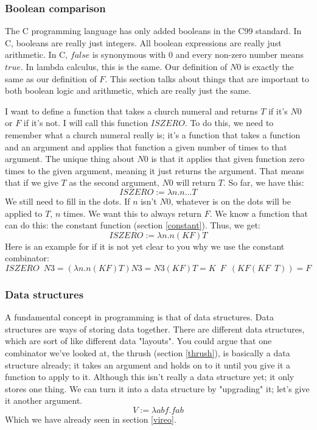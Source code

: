 \documentclass[11pt]{article}
\begin{document}
\subsubsection{Boolean comparison}\label{boolean_comparison}

The C programming language has only added booleans in the C99 standard. In C,
booleans are really just integers. All boolean expressions are really just
arithmetic. In C, \(false\) is synonymous with \(0\) and every non-zero number
means \(true\). In lambda calculus, this is the same. Our definition of \(N0\)
is exactly the same as our definition of \(F\). This section talks about things
that are important to both boolean logic and arithmetic, which are really just
the same.

I want to define a function that takes a church numeral and returns \(T\) if
it's \(N0\) or \(F\) if it's not. I will call this function \(ISZERO\). To do
this, we need to remember what a church numeral really is; it's a function that
takes a function and an argument and applies that function a given number of
times to that argument. The unique thing about \(N0\) is that it applies that
given function zero times to the given argument, meaning it just returns the
argument. That means that if we give \(T\) as the second argument, \(N0\) will
return \(T\). So far, we have this:
\[ISZERO:=\lambda n.n...T\]
We still need to fill in the dots. If \(n\) isn't \(N0\), whatever is on the
dots will be applied to \(T\), \(n\) times. We want this to always return
\(F\). We know a function that can do this: the constant function (section
\ref{constant}). Thus, we get:
\[ISZERO:=\lambda n.n(KF)T\]
Here is an example for if it is not yet clear to you why we use the constant
combinator:
\[ISZERO\enspace N3=(\lambda n.n(KF)T)N3=N3(KF)T=K\enspace F\enspace (KF(KF\enspace T))=F\]

\subsubsection{Data structures}\label{pairs}

A fundamental concept in programming is that of data structures. Data
structures are ways of storing data together. There are different data
structures, which are sort of like different data "layouts". You could argue
that one combinator we've looked at, the thrush (section \ref{thrush}), is
basically a data structure already; it takes an argument and holds on to it
until you give it a function to apply to it. Although this isn't really a data
structure yet; it only stores one thing. We can turn it into a data structure
by "upgrading" it; let's give it another argument.
\[V:=\lambda abf.fab\]
Which we have already seen in section \ref{vireo}.
\end{document}
